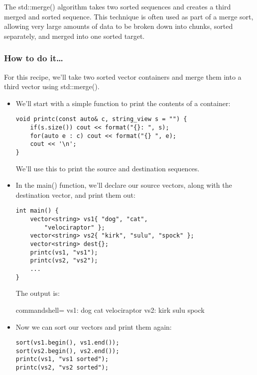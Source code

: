 
The std::merge() algorithm takes two sorted sequences and creates a third merged and sorted sequence. This technique is often used as part of a merge sort, allowing very large amounts of data to be broken down into chunks, sorted separately, and merged into one sorted target.

\subsubsection{How to do it…}

For this recipe, we'll take two sorted vector containers and merge them into a third vector using std::merge().

\begin{itemize}
\item 
We'll start with a simple function to print the contents of a container:

\begin{lstlisting}[style=styleCXX]
void printc(const auto& c, string_view s = "") {
	if(s.size()) cout << format("{}: ", s);
	for(auto e : c) cout << format("{} ", e);
	cout << '\n';
}
\end{lstlisting}

We'll use this to print the source and destination sequences.

\item 
In the main() function, we'll declare our source vectors, along with the destination vector, and print them out:

\begin{lstlisting}[style=styleCXX]
int main() {
	vector<string> vs1{ "dog", "cat",
		"velociraptor" };
	vector<string> vs2{ "kirk", "sulu", "spock" };
	vector<string> dest{};
	printc(vs1, "vs1");
	printc(vs2, "vs2");
	...
}
\end{lstlisting}

The output is:

\begin{tcblisting}{commandshell={}}
vs1: dog cat velociraptor
vs2: kirk sulu spock
\end{tcblisting}

\item 
Now we can sort our vectors and print them again:

\begin{lstlisting}[style=styleCXX]
sort(vs1.begin(), vs1.end());
sort(vs2.begin(), vs2.end());
printc(vs1, "vs1 sorted");
printc(vs2, "vs2 sorted");
\end{lstlisting}


\end{itemize}
